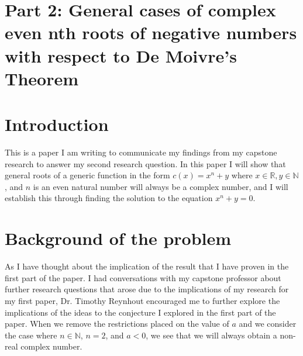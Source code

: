 \documentclass{turabian-researchpaper}
\begin{document}
\section*{Part 2: General cases of complex even nth roots of negative numbers with respect to De Moivre's Theorem}  

\section{Introduction}
This is a paper I am writing to communicate my findings from my capstone research to answer my second research question. In this paper I will show that general roots of a generic function in the form \(c(x) = x^n + y\) where \(x \in \mathds{R}, y \in \mathds{N}\), and \(n\) is an even natural number will always be a complex number, and I will establish this through finding the solution to the equation \(x^n + y = 0\). 


\section{Background of the problem}
\label{sec:headings2} 
 As I have thought about the implication of the result that I have proven in the first part of the paper. I had conversations with my capstone professor about further research questions that arose due to the implications of my research for my first paper, Dr. Timothy Reynhout encouraged me to further explore the implications of the ideas to the conjecture I explored in the first part of the paper. When we remove the restrictions placed on the value of \(a\) and we consider the case where \(n \in \mathds{N}\), \(n = 2\), and \(a < 0\), we see that we will always obtain a non-real complex number.  


\end{document}
